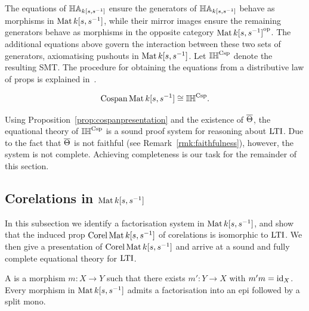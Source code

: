 The equations of $\mathbb{HA}_{k[s,s^{-1}]}$ ensure the generators of $\mathbb{HA}_{k[s,s^{-1}]}$ behave as
morphisms in $\operatorname{\mathrm{Mat}}{k[s,s^{-1}]}$, while their mirror images ensure the remaining
generators behave as morphisms in the opposite category $\operatorname{\mathrm{Mat}}{k[s,s^{-1}]}^{\mathrm{op}}$.
The additional equations above govern the interaction between these two sets of
generators, axiomatising pushouts in $\operatorname{\mathrm{Mat}}{k[s,s^{-1}]}$.
%
Let $\mathbb{IH}^{\mathrm{Csp}}$ denote the resulting SMT.
The procedure for obtaining the equations from a distributive law of props 
is explained in~\cite[\S{3.3}]{Za}.
\begin{proposition}\label{prop:cospanpresentation}
\[\operatorname{{Cospan}} \operatorname{\mathrm{Mat}}{k[s,s^{-1}]} \cong \mathbb{IH}^{\mathrm{Csp}}.\]
\end{proposition}

Using Proposition~\ref{prop:cospanpresentation} and the existence of $\overline{\Theta}$,
the equational theory of $\mathbb{IH}^{\mathrm{Csp}}$ is a sound proof system for reasoning about
$\operatorname{\mathrm{LTI}}$. Due to the fact that $\overline{\Theta}$ is not faithful (see
Remark~\ref{rmk:faithfulness}), however, the system is not complete. Achieving
completeness is our task for the remainder of this section.


\subsection{Corelations in $\operatorname{\mathrm{Mat}}{k[s,s^{-1}]}$}


In this subsection we identify a factorisation system in $\operatorname{\mathrm{Mat}}{k[s,s^{-1}]}$, and show
that the induced prop $\operatorname{{Corel}}\operatorname{\mathrm{Mat}}{k[s,s^{-1}]}$ of corelations is isomorphic to $\operatorname{\mathrm{LTI}}$.
We then give a presentation of $\operatorname{{Corel}}\operatorname{\mathrm{Mat}}{k[s,s^{-1}]}$ and arrive at a sound and fully
complete equational theory for $\operatorname{\mathrm{LTI}}$.

A  is a morphism $m\colon X\to Y$ such that there exists
$m'\colon Y\to X$ with $m'm=\mathrm{id}_X$. Every morphism in $\operatorname{\mathrm{Mat}}{k[s,s^{-1}]}$ admits a
factorisation into an epi followed by a split mono. 


